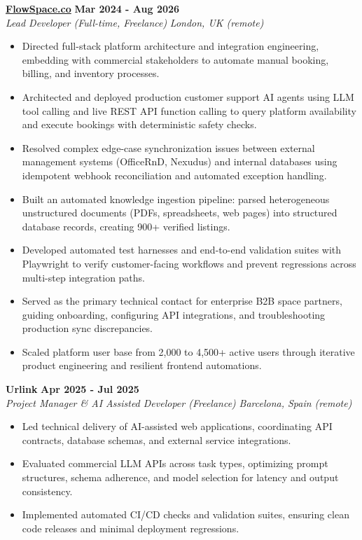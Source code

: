 \documentclass[10pt,a4paper]{article}
\newcommand{\role}[4]{%
  \textbf{#1} \hfill \textbf{#2}\\[1pt]%
  \textit{#3} \hfill \textit{#4}\\[2pt]%
}
\begin{document}
\role{\href{https://flowspace.co}{FlowSpace.co}}{Mar 2024 - Aug 2026}{Lead Developer (Full-time, Freelance)}{London, UK (remote)}
\begin{itemize}
  \item Directed full-stack platform architecture and integration engineering, embedding with commercial stakeholders to automate manual booking, billing, and inventory processes.
  \item Architected and deployed production customer support AI agents using LLM tool calling and live REST API function calling to query platform availability and execute bookings with deterministic safety checks.
  \item Resolved complex edge-case synchronization issues between external management systems (OfficeRnD, Nexudus) and internal databases using idempotent webhook reconciliation and automated exception handling.
  \item Built an automated knowledge ingestion pipeline: parsed heterogeneous unstructured documents (PDFs, spreadsheets, web pages) into structured database records, creating 900+ verified listings.
  \item Developed automated test harnesses and end-to-end validation suites with Playwright to verify customer-facing workflows and prevent regressions across multi-step integration paths.
  \item Served as the primary technical contact for enterprise B2B space partners, guiding onboarding, configuring API integrations, and troubleshooting production sync discrepancies.
  \item Scaled platform user base from 2,000 to 4,500+ active users through iterative product engineering and resilient frontend automations.
\end{itemize}

\role{Urlink}{Apr 2025 - Jul 2025}{Project Manager \& AI Assisted Developer (Freelance)}{Barcelona, Spain (remote)}
\begin{itemize}
  \item Led technical delivery of AI-assisted web applications, coordinating API contracts, database schemas, and external service integrations.
  \item Evaluated commercial LLM APIs across task types, optimizing prompt structures, schema adherence, and model selection for latency and output consistency.
  \item Implemented automated CI/CD checks and validation suites, ensuring clean code releases and minimal deployment regressions.
\end{itemize}
\end{document}
